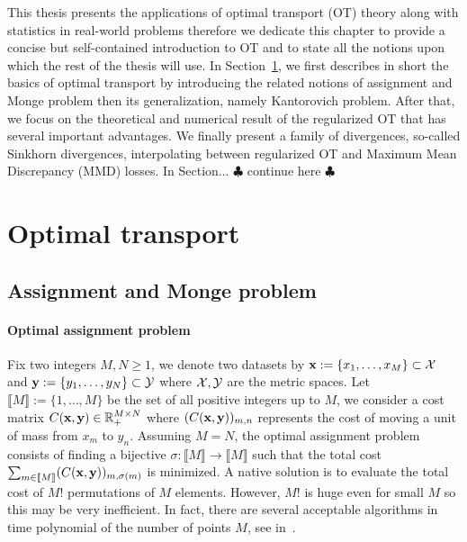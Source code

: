 This thesis presents the applications of optimal transport (OT) theory along with statistics in real-world problems therefore we dedicate this chapter to provide a concise but self-contained introduction to OT and to state all the notions upon which the rest of the thesis will use. In Section~\ref{chap0:sec:ot}, we first describes in short the basics of optimal transport by introducing  the related notions of assignment and Monge problem then its generalization, namely Kantorovich problem. After that, we focus on the theoretical and numerical result of the regularized OT that has several important advantages. We finally present a family of divergences, so-called Sinkhorn divergences,  interpolating between regularized OT and Maximum Mean Discrepancy (MMD) losses. In Section... $\clubsuit$ continue here $\clubsuit$
\section{Optimal transport }
\label{chap0:sec:ot}




\subsection{Assignment and Monge problem}
\label{subsec:Monge}


\paragraph{Optimal assignment problem}
Fix two integers $M, N \geq 1$, we denote two datasets by $\textbf{x} := \{x_1, \ldots, x_M \} \subset \mathcal{X}$ and $\textbf{y} := \{ y_1, \ldots, y_N \} \subset \mathcal{Y}$ where $\mathcal{X}, \mathcal{Y}$ are the metric spaces.  Let $\llbracket M \rrbracket :=\{1, \ldots , M \}$ be the set of all positive integers up to $M$,  we consider a cost matrix $C(\textbf{x},\textbf{y}) \in  \mathbb{R} _{+}^{M \times N}$ where $(C(\textbf{x},\textbf{y}))_{m, n}$ represents the cost of moving a unit of mass from $x_m$ to $y_n$.  Assuming $M=N$, the optimal assignment problem consists of finding a bijective $\sigma: \llbracket M \rrbracket \rightarrow \llbracket M \rrbracket$ such that the total cost $\sum_{m \in \llbracket M \rrbracket} (C(\textbf{x},\textbf{y}))_{m, \sigma(m)} $ is minimized. A native solution is to evaluate the total cost of $M!$ permutations of $M$ elements. However, $M!$ is huge even for small $M$ so this  may be very inefficient. In fact, there are several acceptable algorithms in time polynomial of the number of points $M$, see in~\cite[Section 3.7]{COT19}. 

